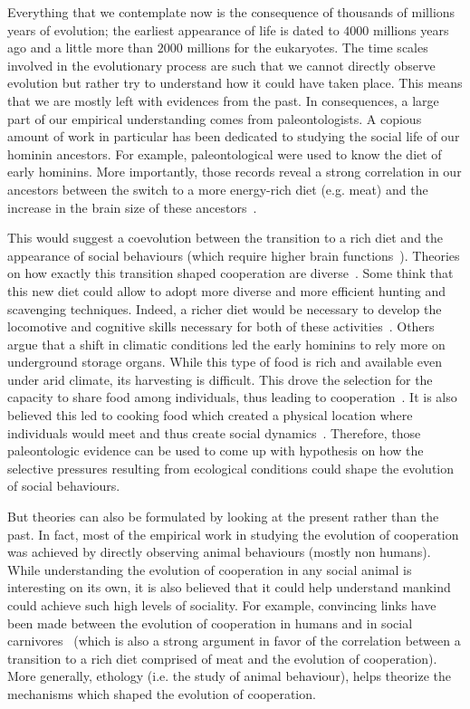     Everything that we contemplate now is the consequence of thousands of millions years of evolution; the earliest appearance of life is dated to $4000$ millions years ago and a little more than $2000$ millions for the eukaryotes. The time scales involved in the evolutionary process are such that we cannot directly observe evolution but rather try to understand how it could have taken place. This means that we are mostly left with evidences from the past. In consequences, a large part of our empirical understanding comes from paleontologists. A copious amount of work in particular has been dedicated to studying the social life of our hominin ancestors. For example, paleontological were used to know the diet of early hominins. More importantly, those records reveal a strong correlation in our ancestors between the switch to a more energy-rich diet (e.g. meat) and the increase in the brain size of these ancestors~\parencite{Aiello1995, Wrangham1999}.

    This would suggest a coevolution between the transition to a rich diet and the appearance of social behaviours (which require higher brain functions~\parencite{Dunbar2007, Isler2012}). Theories on how exactly this transition shaped cooperation are diverse~\parencite{Pontzer2012}. Some think that this new diet could allow to adopt more diverse and more efficient hunting and scavenging techniques. Indeed, a richer diet would be necessary to develop the locomotive and cognitive skills necessary for both of these activities~\parencite{Aiello1995, Bramble2004}. Others argue that a shift in climatic conditions led the early hominins to rely more on underground storage organs. While this type of food is rich and available even under arid climate, its harvesting is difficult. This drove the selection for the capacity to share food among individuals, thus leading to cooperation~\parencite{OConnell2002}. It is also believed this led to cooking food which created a physical location where individuals would meet and thus create social dynamics~\parencite{Wrangham1999, Wrangham2009}. Therefore, those paleontologic evidence can be used to come up with hypothesis on how the selective pressures resulting from ecological conditions could shape the evolution of social behaviours.

    But theories can also be formulated by looking at the present rather than the past. In fact, most of the empirical work in studying the evolution of cooperation was achieved by directly observing animal behaviours (mostly non humans). While understanding the evolution of cooperation in any social animal is interesting on its own, it is also believed that it could help understand mankind could achieve such high levels of sociality. For example, convincing links have been made between the evolution of cooperation in humans and in social carnivores~\parencite{Schaller1969, Smith2012a} (which is also a strong argument in favor of the correlation between a transition to a rich diet comprised of meat and the evolution of cooperation). More generally, ethology (i.e. the study of animal behaviour), helps theorize the mechanisms which shaped the evolution of cooperation.

